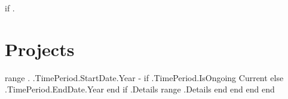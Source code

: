 {{if .}}
\section{Projects}
\vspace{-5pt}
    \resumeSubHeadingListStart
    {{range .}}
         { {{.TimePeriod.StartDate.Year}} - {{if .TimePeriod.IsOngoing}} Current {{else}} {{.TimePeriod.EndDate.Year}} {{end}} }
            {{if .Details}}
            \vspace{-16pt}
            \resumeItemListStart
                {{range .Details}} 
                {{end}}
            \resumeItemListEnd
            {{end}}
    {{end}}
    \resumeSubHeadingListEnd
\vspace{-16pt}
{{end}}
